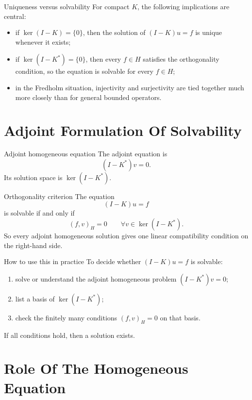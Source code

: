 \documentclass[11pt]{article}
\begin{document}
\begin{thmbox}{Uniqueness versus solvability}
For compact $K$, the following implications are central:
\begin{itemize}
\item if $\ker(I-K)=\{0\}$, then the solution of $(I-K)u=f$ is unique whenever it exists;
\item if $\ker(I-K^*)=\{0\}$, then every $f\in H$ satisfies the orthogonality condition, so the equation is solvable for every $f\in H$;
\item in the Fredholm situation, injectivity and surjectivity are tied together much more closely than for general bounded operators.
\end{itemize}
\end{thmbox}

\section{Adjoint Formulation Of Solvability}

\begin{defbox}{Adjoint homogeneous equation}
The adjoint equation is
\[
(I-K^*)v=0.
\]
Its solution space is $\ker(I-K^*)$.
\end{defbox}

\begin{thmbox}{Orthogonality criterion}
The equation
\[
(I-K)u=f
\]
is solvable if and only if
\[
(f,v)_H=0 \qquad \forall v\in \ker(I-K^*).
\]
So every adjoint homogeneous solution gives one linear compatibility condition on the right-hand side.
\end{thmbox}

\begin{exbox}{How to use this in practice}
To decide whether $(I-K)u=f$ is solvable:
\begin{enumerate}
\item solve or understand the adjoint homogeneous problem $(I-K^*)v=0$;
\item list a basis of $\ker(I-K^*)$;
\item check the finitely many conditions $(f,v)_H=0$ on that basis.
\end{enumerate}
If all conditions hold, then a solution exists.
\end{exbox}

\section{Role Of The Homogeneous Equation}
\end{document}

